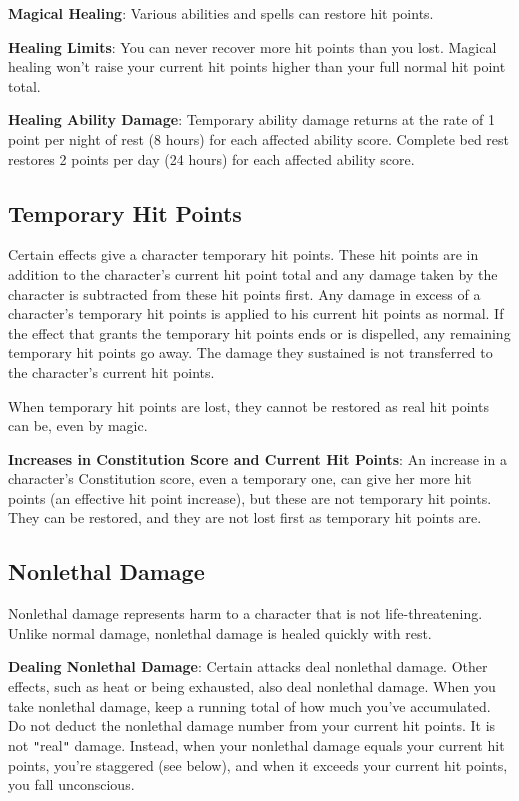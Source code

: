 \textbf{Magical Healing}: Various abilities and spells can restore hit points.
				
\textbf{Healing Limits}: You can never recover more hit points than you lost. Magical healing won't raise your current hit points higher than your full normal hit point total.
				
\textbf{Healing Ability Damage}: Temporary ability damage returns at the rate of 1 point per night of rest (8 hours) for each affected ability score. Complete bed rest restores 2 points per day (24 hours) for each affected ability score.
				
\subsection{Temporary Hit Points}

				
Certain effects give a character temporary hit points. These hit points are in addition to the character's current hit point total and any damage taken by the character is subtracted from these hit points first. Any damage in excess of a character's temporary hit points is applied to his current hit points as normal. If the effect that grants the temporary hit points ends or is dispelled, any remaining temporary hit points go away. The damage they sustained is not transferred to the character's current hit points.
				
When temporary hit points are lost, they cannot be restored as real hit points can be, even by magic.
				
\textbf{Increases in Constitution Score and Current Hit Points}: An increase in a character's Constitution score, even a temporary one, can give her more hit points (an effective hit point increase), but these are not temporary hit points. They can be restored, and they are not lost first as temporary hit points are.
				
\subsection{Nonlethal Damage}

				
Nonlethal damage represents harm to a character that is not life-threatening. Unlike normal damage, nonlethal damage is healed quickly with rest.
				
\textbf{Dealing Nonlethal Damage}: Certain attacks deal nonlethal damage. Other effects, such as heat or being exhausted, also deal nonlethal damage. When you take nonlethal damage, keep a running total of how much you've accumulated. Do not deduct the nonlethal damage number from your current hit points. It is not \texttt{{}"{}}real\texttt{{}"{}} damage. Instead, when your nonlethal damage equals your current hit points, you're staggered (see below), and when it exceeds your current hit points, you fall unconscious.
				
